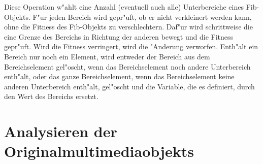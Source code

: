 Diese Operation w"ahlt eine Anzahl (eventuell auch alle) Unterbereiche eines Fib-Objekts.
F"ur jeden Bereich wird gepr"uft, ob er nicht verkleinert werden kann, ohne die Fitness des Fib-Objekts zu verschlechtern. Daf"ur wird schrittweise die eine Grenze des Bereichs in Richtung der anderen bewegt und die Fitness gepr"uft. Wird die Fitness verringert, wird die "Anderung verworfen. Enth"alt ein Bereich nur noch ein Element, wird entweder der Bereich aus dem Bereichselement gel"oscht, wenn das Bereichselement noch andere Unterbereich enth"alt, oder das ganze Bereichselement, wenn das Bereichselement keine anderen Unterbereich enth"alt, gel"oscht und die Variable, die es definiert, durch den Wert des Bereichs ersetzt.


















\section{Analysieren der Originalmultimediaobjekts}

